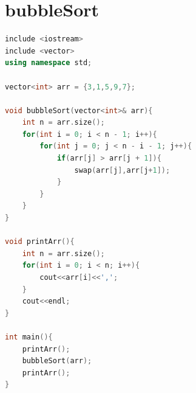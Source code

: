 \documentclass[12pt,twiside,a4paper]{ctexbook}
\numberwithin{chapter}{part}
\begin{document}
\section{bubbleSort}
\begin{lstlisting}[language=C++]
include <iostream>
include <vector>
using namespace std;

vector<int> arr = {3,1,5,9,7};

void bubbleSort(vector<int>& arr){
	int n = arr.size();
	for(int i = 0; i < n - 1; i++){
		for(int j = 0; j < n - i - 1; j++){
			if(arr[j] > arr[j + 1]){
				swap(arr[j],arr[j+1]);
			}
		}
	}
}

void printArr(){
	int n = arr.size();
	for(int i = 0; i < n; i++){
		cout<<arr[i]<<',';
	}
	cout<<endl;
}

int main(){
	printArr();
	bubbleSort(arr);
	printArr();
}
\end{lstlisting}
\end{document}
